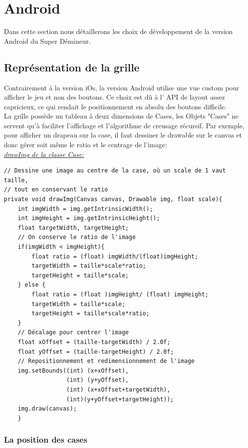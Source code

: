 \documentclass{article}
\begin{document}
\section{Android}
Dans cette section nous détaillerons les choix de développement de la version Android du Super Démineur.

\subsection{Représentation de la grille}

Contrairement à la version iOs, la version Android utilise une vue custom \cite{androidProf} pour  afficher le jeu et non des boutons. Ce choix est dû à l' API  de layout assez capricieux, ce qui rendait le positionnement en absolu des boutons difficile.\\

La grille possède un tableau à deux dimensions de Cases, les Objets "Cases" ne servent qu'à faciliter l'affichage et l'algorithme de creusage récursif. Par exemple, pour afficher un drapeau sur la case, il faut dessiner le drawable sur le canvas et donc gérer soit même le ratio et le centrage de l'image:\\

\noindent\underline{\textit{drawImg de la  classe Case:}}
\begin{verbatim}
// Dessine une image au centre de la case, où un scale de 1 vaut taille, 
// tout en conservant le ratio
private void drawImg(Canvas canvas, Drawable img, float scale){
    int imgWidth = img.getIntrinsicWidth();
    int imgHeight = img.getIntrinsicHeight();
    float targetWidth, targetHeight;
    // On conserve le ratio de l'image
    if(imgWidth < imgHeight){
        float ratio = (float) imgWidth/(float)imgHeight;
        targetWidth = taille*scale*ratio;
        targetHeight = taille*scale;
    } else {
        float ratio = (float )imgHeight/ (float) imgHeight;
        targetWidth = taille*scale;
        targetHeight = taille*scale*ratio;
    }
    // Décalage pour centrer l'image
    float xOffset = (taille-targetWidth) / 2.0f;
    float yOffset = (taille-targetHeight) / 2.0f;
    // Repositionnement et redimensionnement de l'image
    img.setBounds((int) (x+xOffset), 
                  (int) (y+yOffset), 
                  (int) (x+xOffset+targetWidth), 
                  (int)(y+yOffset+targetHeight));
    img.draw(canvas);
    }
\end{verbatim}

\subsubsection{La position des cases}
\end{document}
